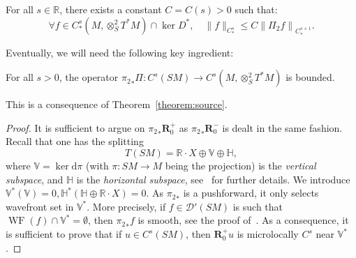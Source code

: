 \documentclass[AHL,Unicode,longabstracts,published]{cedram}
\newcommand{\R}{\mathbb{R}}
\newcommand{\RR}{\mathbf{R}}
\newcommand{\V}{\mathbb{V}}
\newcommand{\HH}{\mathbb{H}}
\newcommand{\mc}{\mathcal}
\newcommand{\dd}{\mathrm{d}}
\DeclareMathOperator{\WF}{WF}
\let\oldforall\forall
\renewcommand*{\forall}{\mathrel{\oldforall}}
\begin{document}
\begin{lemm}\label{lemma:bound}
For all $s \in \R$, there exists a constant $C = C(s) > 0$ such that:
\[
\forall f \in C^s_*\left(M,\otimes^2_S T^*M\right) \cap \ker D^*,\quad\|f\|_{C^s_*} \leq C \left\|\Pi_2f\right\|_{C^{s+1}_*}.
\]
\end{lemm}

Eventually, we will need the following key ingredient:

\begin{lemm}\label{lemma:bound2}
For all $s > 0$, the operator ${\pi_2}_* \Pi : C^s(SM) \rightarrow C^s(M, \otimes^2_S T^*M)$ is bounded.
\end{lemm}

This is a consequence of Theorem~\ref{theorem:source}.

\begin{proof}
It is sufficient to argue on ${\pi_2}_* \RR_0^+$ as ${\pi_2}_* \RR_0^-$ is dealt in the same fashion. Recall that one has the splitting
\[
T(SM) = \R \cdot X \oplus \V \oplus \HH,
\]
where $\V = \ker \dd \pi$ (with $\pi : SM \rightarrow M$ being the projection) is the \emph{vertical subspace}, and $\HH$ is the \emph{horizontal subspace}, see~\cite{Paternain-99} for further details. We introduce $\V^*(\V)=0,\HH^*(\HH \oplus \R \cdot X) = 0$. As ${\pi_2}_*$ is a pushforward, it only selects wavefront set in $\V^*$. More precisely, if $f \in \mc{D}'(SM)$ is such that $\WF(f) \cap \V^* = \emptyset$, then ${\pi_2}_* f$ is smooth, see the proof of~\cite[Theorem~3.1]{Guillarmou-17-1}. As a consequence, it is sufficient to prove that if $u \in C^s(SM)$, then $\RR_0^+ u$ is microlocally $C^s$ near $\V^*$.


\end{proof}
\end{document}
